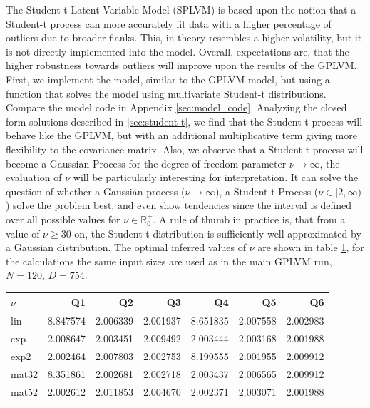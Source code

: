 The Student-t Latent Variable Model (SPLVM) is based upon the notion that a Student-t process can more accurately fit data with a higher percentage of outliers due to broader flanks. This, in theory resembles a higher volatility, but it is not directly implemented into the model. Overall, expectations are, that the higher robustness towards outliers will improve upon the results of the GPLVM. \newline \newline
First, we implement the model, similar to the GPLVM model, but using a function that solves the model using multivariate Student-t distributions. Compare the model code in Appendix \ref{sec:model_code}. Analyzing the closed form solutions described in \ref{sec:student-t}, we find that the Student-t process will behave like the GPLVM, but with an additional multiplicative term giving more flexibility to the covariance matrix. Also, we observe that a Student-t process will become a Gaussian Process for the degree of freedom parameter $\nu \to \infty$, the evaluation of $\nu$ will be particularly interesting for interpretation. It can solve the question of whether a Gaussian process ($\nu \to \infty$), a Student-t Process ($\nu \in [2,\infty)$) solve the problem best, and even show tendencies since the interval is defined over all possible values for $\nu \in \mathbb{R}_0^+$. A rule of thumb in practice is, that from a value of $\nu \geq 30$ on, the Student-t distribution is sufficiently well approximated by a Gaussian distribution. 
The optimal inferred values of $\nu$ are shown in table \ref{tab:splvm_nu}, for the calculations the same input sizes are used as in the main GPLVM run, $N=120$, $D=754$. 
\begin{table}
    \centering
	\begin{tabular}{||l|r|r|r|r|r|r||}\hline
		$\nu$     & Q1        &  Q2       & Q3        & Q4        & Q5        & Q6        \\ \hline
		lin       &  8.847574 &  2.006339 &  2.001937 &  8.651835 &  2.007558 &  2.002983 \\
		exp       &  2.008647 &  2.003451 &  2.009492 &  2.003444 &  2.003168 &  2.001988 \\
		exp2      &  2.002464 &  2.007803 &  2.002753 &  8.199555 &  2.001955 &  2.009912 \\
		mat32     &  8.351861 &  2.002681 &  2.002718 &  2.003437 &  2.006565 &  2.009912 \\
		mat52     &  2.002612 &  2.011853 &  2.004670 &  2.002371 &  2.003071 &  2.001988 \\ \hline
	\end{tabular}
	\label{tab:splvm_nu}
\end{table}
